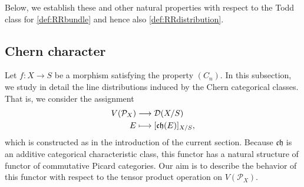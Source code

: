 \documentclass[11pt]{article}
\newcommand\mto{\mathchoice{\longmapsto}{\mapsto}{\mapsto}{\mapsto}}
\theoremstyle{plain}
\theoremstyle{definition}
\newcommand{\Dcal}{\mathcal D}
\newcommand{\Pcal}{\mathcal P}
\newcommand{\chfrak}{\mathfrak {ch}}
\begin{document}
Below, we establish these and other natural properties with respect to the Todd class for \eqref{def:RRbundle} and hence also \eqref{def:RRdistribution}.

\subsection{Chern character}
Let $f\colon X\to S$ be a morphism satisfying the property $(C_{n})$. In this subsection, we study in detail the line distributions induced by the Chern categorical classes. That is, we consider the assignment
\begin{displaymath}
\begin{split}
V(\Pcal_{X})&\longrightarrow \Dcal(X/S)\\
E&\mto [\chfrak(E)]_{X/S},
\end{split}
\end{displaymath}
which is constructed as in the introduction of the current section. Because $\chfrak$ is an additive categorical characteristic class, this functor has a natural structure of functor of commutative Picard categories. Our aim is to describe the behavior of this functor with respect to the tensor product operation on $V(\Pcal_{X})$.
\end{document}
